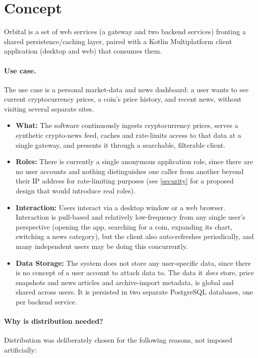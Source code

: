 \documentclass{scrartcl}
\begin{document}
\clearpage

\tableofcontents

\section{Concept}\label{concept}

Orbital is a set of web services (a gateway and two backend services) fronting a shared
persistence/caching layer, paired with a Kotlin Multiplatform client application (desktop and
web) that consumes them.

\paragraph{Use case.} The use case is a personal market-data and news dashboard: a user wants to
see current cryptocurrency prices, a coin's price history, and recent news, without visiting
several separate sites.

\begin{itemize}
  \item \textbf{What:} The software continuously ingests cryptocurrency prices, serves a synthetic crypto-news feed, caches
  and rate-limits access to that data at a single gateway, and presents it through a searchable,
  filterable client.
  \item \textbf{Roles:} There is currently a single anonymous application role, since there are no user
  accounts and nothing distinguishes one caller from another beyond their IP address for
  rate-limiting purposes (see \cref{security} for a proposed design that would introduce real
  roles).
  \item \textbf{Interaction:} Users interact via a desktop window or a web browser. Interaction is
  pull-based and relatively low-frequency from any single user's perspective (opening the app,
  searching for a coin, expanding its chart, switching a news category), but the client also
  auto-refreshes periodically, and many independent users may be doing this concurrently.
  \item \textbf{Data Storage:} The system does not store any user-specific data, since there is no
  concept of a user account to attach data to. The data it \emph{does} store, price snapshots and
  news articles and archive-import metadata, is global and shared across users. It is persisted
  in two separate PostgreSQL databases, one per backend service.
\end{itemize}

\paragraph{Why is distribution needed?} Distribution was deliberately chosen for the following
reasons, not imposed artificially:
\end{document}
